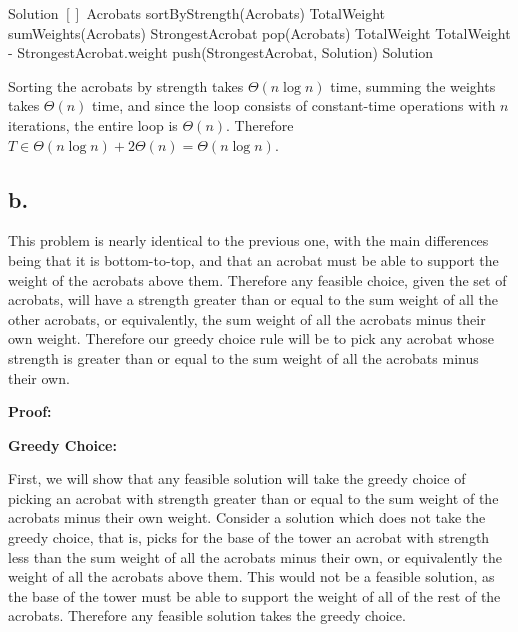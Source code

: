 \documentclass[11pt]{article}
\begin{document}
\begin{algorithm}[H]
\begin{algorithmic}
\State Solution \gets $[]$
\State Acrobats \gets sortByStrength(Acrobats) 
\State TotalWeight \gets sumWeights(Acrobats)
    \State StrongestAcrobat \gets pop(Acrobats) 
        \State TotalWeight \gets TotalWeight - StrongestAcrobat.weight
        \State push(StrongestAcrobat, Solution) 
    \Else  
        \State {} 
    \EndIf
\EndFor
\State \Return Solution
\end{algorithmic}
\end{algorithm}

Sorting the acrobats by strength takes $\Theta(n\log n)$ time, summing the weights takes $\Theta(n)$ time, and since the loop consists of constant-time operations with $n$ iterations, the entire loop is $\Theta(n)$. Therefore $T \in \Theta(n \log n) + 2\Theta (n) = \Theta(n \log n)$.

\subsection*{b.}
This problem is nearly identical to the previous one, with the main differences being that it is bottom-to-top, and that an acrobat must be able to support the weight of the acrobats above them. Therefore any feasible choice, given the set of acrobats, will have a strength greater than or equal to the sum weight of all the other acrobats, or equivalently, the sum weight of all the acrobats minus their own weight. Therefore our greedy choice rule will be to pick any acrobat whose strength is greater than or equal to the sum weight of all the acrobats minus their own. 

\textbf{Proof: }

\textbf{Greedy Choice: }

First, we will show that any feasible solution will take the greedy choice of picking an acrobat with strength greater than or equal to the sum weight of the acrobats minus their own weight. Consider a solution which does not take the greedy choice, that is, picks for the base of the tower an acrobat with strength less than the sum weight of all the acrobats minus their own, or equivalently the weight of all the acrobats above them. This would not be a feasible solution, as the base of the tower must be able to support the weight of all of the rest of the acrobats. Therefore any feasible solution takes the greedy choice.
\end{document}
